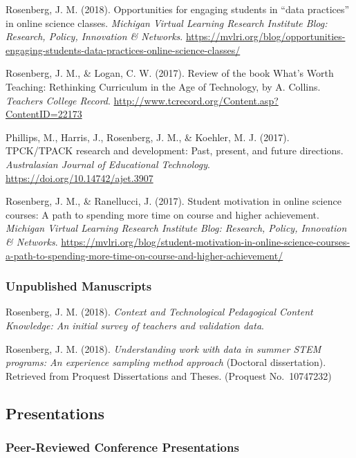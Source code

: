 \documentclass[14,]{article}
\begin{document}
Rosenberg, J. M. (2018). Opportunities for engaging students in ``data
practices'' in online science classes. \emph{Michigan Virtual Learning
Research Institute Blog: Research, Policy, Innovation \& Networks}.
\url{https://mvlri.org/blog/opportunities-engaging-students-data-practices-online-science-classes/}

Rosenberg, J. M., \& Logan, C. W. (2017). Review of the book What's
Worth Teaching: Rethinking Curriculum in the Age of Technology, by A.
Collins. \emph{Teachers College Record}.
\url{http://www.tcrecord.org/Content.asp?ContentID=22173}

Phillips, M., Harris, J., Rosenberg, J. M., \& Koehler, M. J. (2017).
TPCK/TPACK research and development: Past, present, and future
directions. \emph{Australasian Journal of Educational Technology}.
\url{https://doi.org/10.14742/ajet.3907}

Rosenberg, J. M., \& Ranellucci, J. (2017). Student motivation in online
science courses: A path to spending more time on course and higher
achievement. \emph{Michigan Virtual Learning Research Institute Blog:
Research, Policy, Innovation \& Networks}.
\url{https://mvlri.org/blog/student-motivation-in-online-science-courses-a-path-to-spending-more-time-on-course-and-higher-achievement/}

\hypertarget{unpublished-manuscripts}{%
\subsubsection{Unpublished Manuscripts}\label{unpublished-manuscripts}}

Rosenberg, J. M. (2018). \emph{Context and Technological Pedagogical
Content Knowledge: An initial survey of teachers and validation data}.

Rosenberg, J. M. (2018). \emph{Understanding work with data in summer
STEM programs: An experience sampling method approach} (Doctoral
dissertation). Retrieved from Proquest Dissertations and Theses.
(Proquest No.~10747232)

\hypertarget{presentations}{%
\subsection{Presentations}\label{presentations}}

\hypertarget{peer-reviewed-conference-presentations}{%
\subsubsection{Peer-Reviewed Conference
Presentations}\label{peer-reviewed-conference-presentations}}
\end{document}
